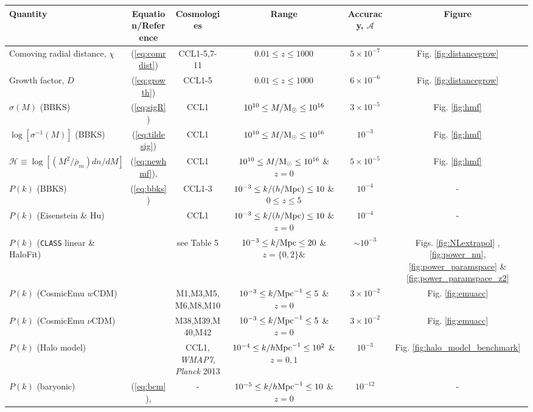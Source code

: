 
%
\begin{sidewaystable*}[!htp]
  \centering
  \begin{tabular}{ l|c c c c c}
    \hline
    Quantity & Equation/Reference & Cosmologies & Range & Accuracy, $\mathcal{A}$ & Figure \\
    \hline
    Comoving radial distance, $\chi$ & (\ref{eq:comrdist}) & CCL1-5,7-11 & $0.01 \leq z\leq 1000$ &  $5\times 10^{-7}$ & Fig. \ref{fig:distancegrow}\\
    Growth factor, $D$ & (\ref{eq:growth}) & CCL1-5 &  $0.01 \leq z\leq 1000 $ &  $6\times 10^{-6}$ & Fig. \ref{fig:distancegrow}\\
    $\sigma(M)$ (BBKS) & (\ref{eq:sigR}) & CCL1 &  $10^{10}\leq M/{\rm M}_\odot\leq 10^{16}$ &  $3\times 10^{-5}$ & Fig. \ref{fig:hmf}\\
    $\log[\sigma^{-1}(M)]$ (BBKS) & (\ref{eq:tildesig}) & CCL1 &  $10^{10}\leq M/{\rm M}_\odot\leq 10^{16}$ &  $10^{-3}$ & Fig. \ref{fig:hmf}\\
    $\mathcal H \equiv \log[(M^2/\bar{\rho}_m)dn/dM]$  & (\ref{eq:newhmf}), \citet{Tinker2010} & CCL1 & $10^{10}\leq M/{\rm M}_\odot\leq 10^{16}$ \& $z=0$ & $5\times 10^{-5}$ & Fig. \ref{fig:hmf}\\
    $P(k)$ (BBKS) & (\ref{eq:bbks}) & CCL1-3 & $10^{-3}\leq k/(h/{\rm Mpc})\leq 10$ \& $0\leq z\leq 5$ &  $10^{-4}$ & -\\
    $P(k)$ (Eisenstein \& Hu) & \citet{1998ApJ...496..605E}  & CCL1 & $10^{-3}\leq k/(h/{\rm Mpc})\leq 10$ \& $z=0$ & $10^{-4}$ & -\\
    $P(k)$ ({\tt CLASS} linear \& HaloFit) & \citet{CLASS_halofit}  & see Table 5 & $10^{-3}\leq k/{\rm Mpc}\leq 20$ \& $z=\{0,2\}$\&  & $\sim 10^{-3}$ & Figs. \ref{fig:NLextrapol} , \ref{fig:power_nu}, \ref{fig:power_paramspace} \& \ref{fig:power_paramspace_z2} \\
    $P(k)$ (CosmicEmu $w$CDM) & \citet{Lawrence17} & M1,M3,M5,M6,M8,M10 & $10^{-3}\leq k/{\rm Mpc}^{-1}\leq 5$ \& $z=0$  & $3\times 10^{-2}$ & Fig. \ref{fig:emuacc}\\
    $P(k)$ (CosmicEmu $\nu$CDM) & \citet{Lawrence17} & M38,M39,M40,M42 & $10^{-3}\leq k/{\rm Mpc}^{-1}\leq 5$ \& $z=0$ & $3\times 10^{-2}$ & Fig. \ref{fig:emuacc}\\
    $P(k)$ (Halo model) & \citet{Cooray2002} & CCL1, {\it WMAP7}, {\it Planck} 2013 & $10^{-4}\leq k/h{\rm Mpc}^{-1}\leq 10^{2}$ \& $z=0,1$ & $10^{-3}$ & Fig. \ref{fig:halo_model_benchmark}\\
    $P(k)$ (baryonic) & (\ref{eq:bcm}), \citet{Schneider15} &  - & $10^{-5}\leq k/h{\rm Mpc}^{-1}\leq 10$ \& $z=0$ & $10^{-12}$ & -\\

\end{tabular}
\end{sidewaystable*}
